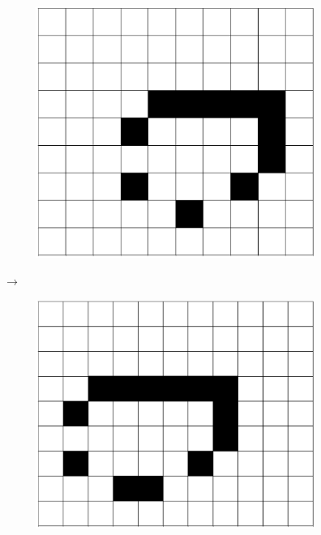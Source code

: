 \documentclass[12pt]{article}
\numberwithin{figure}{section} %
\begin{document}
\begin{figure}[H]
\begin{subfigure}{0.18\textwidth}
     \centering
     \includegraphics[width=\linewidth]{Section1/6.4}
     \subcaption{}
   \end{subfigure}
   {\LARGE$\xrightarrow{}$}
\setcounter{subfigure}{0}
\centering
  \begin{subfigure}{0.18\textwidth}
     \centering
     \includegraphics[width=\linewidth]{Section1/7.0}
     \subcaption{}

\end{subfigure}
\end{figure}
\end{document}
